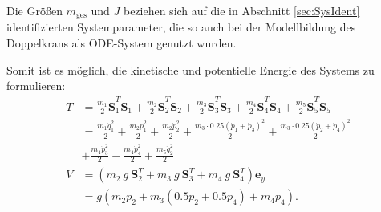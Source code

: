 Die Größen $m_{\mathrm{ges}}$ und $J$ beziehen sich auf die in Abschnitt \ref{sec:SysIdent} identifizierten Systemparameter, die so auch bei der Modellbildung des Doppelkrans als ODE-System genutzt wurden.

Somit ist es möglich, die kinetische und potentielle Energie des Systems zu formulieren:
\begin{align}
	T &= \frac{m_1}{2} \dot{\mathbf{S}}_1^T \dot{\mathbf{S}}_1 + \frac{m_2}{2} \dot{\mathbf{S}}_2^T \dot{\mathbf{S}}_2 + \frac{m_3}{2} \dot{\mathbf{S}}_3^T \dot{\mathbf{S}}_3 + \frac{m_4}{2} \dot{\mathbf{S}}_4^T \dot{\mathbf{S}}_4 + \frac{m_5}{2} \dot{\mathbf{S}}_5^T \dot{\mathbf{S}}_5 \nonumber \\  
	&= \frac{m_{1} \dot{q}_{1}^{2}}{2} + \frac{m_{2} \dot{p}_{1}^{2}}{2} + \frac{m_{2} \dot{p}_{2}^{2}}{2} + \frac{m_{3} \cdot 0.25 \left(\dot{p}_{1} + \dot{p}_{3}\right)^{2}}{2} + \frac{m_{3} \cdot 0.25 \left(\dot{p}_{2} + \dot{p}_{4}\right)^{2}}{2} \nonumber \\
	&+ \frac{m_{4} \dot{p}_{3}^{2}}{2} + \frac{m_{4} \dot{p}_{4}^{2}}{2} + \frac{m_{5} \dot{q}_{2}^{2}}{2} \\
	V &= (m_2 \ g \ \mathbf{S}_2^T + m_3 \ g \ \mathbf{S}_3^T + m_4 \ g \ \mathbf{S}_4^T) \mathbf{e}_y \nonumber \\ &= g \left(m_{2} p_{2} + m_{3} \left(0.5 p_{2} + 0.5 p_{4}\right) + m_{4} p_{4}\right).
\end{align}

